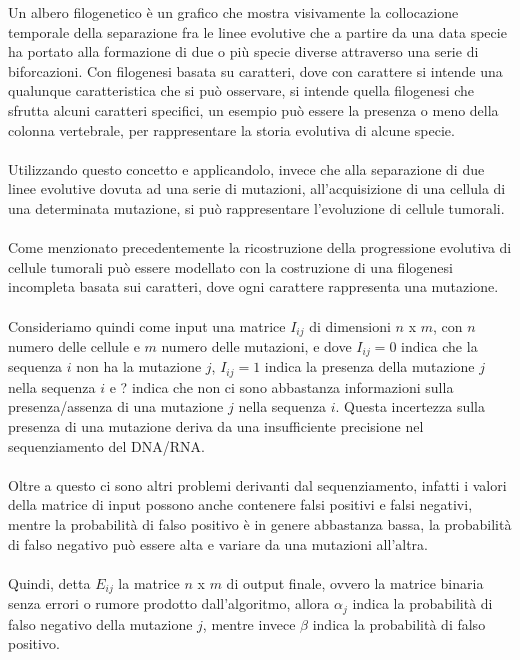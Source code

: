 \documentclass[12pt]{report}
\begin{document}
  Un albero filogenetico è un grafico che mostra visivamente la collocazione temporale della separazione fra le linee evolutive che a partire da una data specie ha portato alla formazione di due o più specie diverse attraverso una serie di biforcazioni.
  Con filogenesi basata su caratteri, dove con carattere si intende una qualunque caratteristica che si può osservare, si intende quella filogenesi che sfrutta alcuni caratteri specifici, un esempio può essere la presenza o meno della colonna vertebrale, per rappresentare la storia evolutiva di alcune specie.\\\\
  Utilizzando questo concetto e applicandolo, invece che alla separazione di due linee evolutive dovuta ad una serie di mutazioni, all'acquisizione di una cellula di una determinata mutazione, si può rappresentare l'evoluzione di cellule tumorali.\\\\
  Come menzionato precedentemente la ricostruzione della progressione evolutiva di cellule tumorali può essere modellato con la costruzione di una filogenesi incompleta basata sui caratteri, dove ogni carattere rappresenta una mutazione.\\\\
  Consideriamo quindi come input una matrice  ${I}_{ij}$ di dimensioni $n$ x $m$, con $n$ numero delle cellule e $m$ numero delle mutazioni, e dove ${I}_{ij} = 0$ indica che la sequenza $i$ non ha la mutazione $j$, ${I}_{ij} = 1$ indica la presenza della mutazione $j$ nella sequenza $i$ e ? indica che non ci sono abbastanza informazioni sulla presenza/assenza di una mutazione $j$ nella sequenza $i$.
  Questa incertezza sulla presenza di una mutazione deriva da una insufficiente precisione nel sequenziamento del DNA/RNA.\\\\
  Oltre a questo ci sono altri problemi derivanti dal sequenziamento, infatti i valori della matrice di input possono anche contenere falsi positivi e falsi negativi, mentre la probabilità di falso positivo è in genere abbastanza bassa, la probabilità di falso negativo può essere alta e variare da una mutazioni all'altra.\\\\
  Quindi, detta $E_{ij}$ la matrice $n$ x $m$ di output finale, ovvero la matrice binaria senza errori o rumore prodotto dall'algoritmo, allora ${\alpha}_{j}$ indica la probabilità di falso negativo della mutazione $j$, mentre invece $\beta$ indica la probabilità di falso positivo.\\
\end{document}
